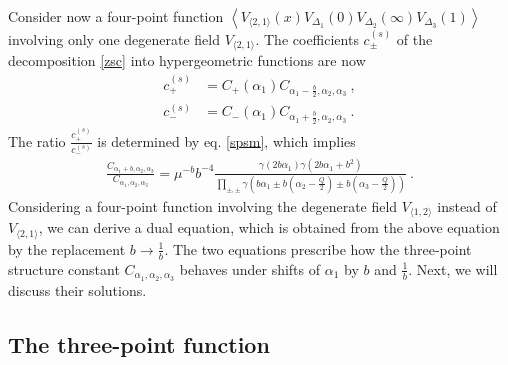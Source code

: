 \documentclass[12pt,a4paper,notitlepage]{report}
\numberwithin{equation}{section}
\theoremstyle{break}
\begin{document}
Consider now a four-point function $\left\langle V_{\langle 2,1 \rangle}(x)V_{\Delta_1}(0)V_{\Delta_2}(\infty)V_{\Delta_3}(1)\right\rangle$ involving only one degenerate field $V_{\langle 2,1 \rangle}$.
The coefficients $c^{(s)}_\pm$ of the decomposition \eqref{zsc} into hypergeometric functions are now 
\begin{align}
 c_+^{(s)} & = C_+(\alpha_1) C_{\alpha_1-\frac{b}{2},\alpha_2,\alpha_3} \ ,
\\
c_-^{(s)} & = C_-(\alpha_1) C_{\alpha_1+\frac{b}{2},\alpha_2,\alpha_3}\ .
\end{align}
The ratio $\frac{c_+^{(s)}}{c_-^{(s)}}$ is determined by eq. \eqref{spsm}, which implies
\begin{align}
 \frac{C_{\alpha_1+b,\alpha_2,\alpha_3}}{C_{\alpha_1,\alpha_2,\alpha_3}} = \mu^{-b} b^{-4}\frac{\gamma(2b\alpha_1)\gamma(2b\alpha_1+b^2)}{\prod_{\pm,\pm} \gamma\left(b\alpha_1\pm b(\alpha_2-\frac{Q}{2})\pm b(\alpha_3-\frac{Q}{2})\right)}\ .
\label{fcc}
\end{align}
Considering a four-point function involving the degenerate field $V_{\langle 1,2 \rangle}$ instead of $V_{\langle 2,1 \rangle}$, we can derive a dual equation, which is obtained from the above equation by the replacement $b\rightarrow \frac{1}{b}$. 
The two equations prescribe how the three-point structure constant $C_{\alpha_1,\alpha_2,\alpha_3}$ behaves under shifts of $\alpha_1$ by $b$ and $\frac{1}{b}$.
Next, we will discuss their solutions.


\subsection{The three-point function \label{sectpf}}
\end{document}
